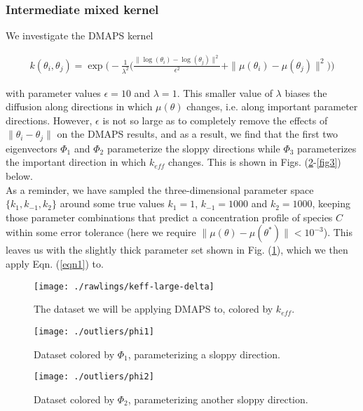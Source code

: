 \documentclass[11pt]{article}
\begin{document}
\subsubsection{Intermediate mixed kernel}

We investigate the DMAPS kernel

\begin{align}
  k(\theta_i, \theta_j) = \exp \bigg( -\frac{1}{\lambda^2} \bigg( \frac{\|\log(\theta_i)
  - \log(\theta_j)\|^2}{\epsilon^2} + \|\mu(\theta_i) -
  \mu(\theta_j)\|^2\bigg) \bigg)
  \label{eqn1}
\end{align}

with parameter values $\epsilon = 10$ and $\lambda = 1$. This smaller
value of $\lambda$ biases the diffusion along directions in which
$\mu(\theta)$ changes, i.e. along important parameter
directions. However, $\epsilon$ is not so large as to completely
remove the effects of $\| \theta_i - \theta_j \|$ on the DMAPS
results, and as a result, we find that the first two eigenvectors
$\Phi_1$ and $\Phi_2$ parameterize the sloppy directions while
$\Phi_3$ parameterizes the important direction in which $k_{eff}$
changes. This is shown in Figs. (\ref{fig1}-\ref{fig3}) below. \\

As a reminder, we have sampled the three-dimensional parameter space
$\{k_1, k_{-1}, k_2 \}$ around some true values $k_1 = 1$,
$k_{-1} = 1000$ and $k_2 = 1000$, keeping those parameter combinations that
predict a concentration profile of species $C$ within some error
tolerance (here we require $\| \mu(\theta) - \mu(\theta^*) \| <
10^{-3}$). This leaves us with the slightly thick parameter set shown
in Fig. (\ref{fig0}), which we then apply Eqn. (\ref{eqn1}) to.

\begin{figure}[htbp]
  \centering
  \texttt{[image: ./rawlings/keff-large-delta]}
  \caption{The dataset we will be applying DMAPS to, colored by
    $k_{eff}$. \label{fig0}}
\end{figure}

\begin{figure}[htbp]
  \centering
  \texttt{[image: ./outliers/phi1]}
  \caption{Dataset colored by $\Phi_1$, parameterizing a sloppy
    direction. \label{fig1}}
\end{figure}

\begin{figure}[htbp]
  \centering
  \texttt{[image: ./outliers/phi2]}
  \caption{Dataset colored by $\Phi_2$, parameterizing another sloppy
    direction. \label{fig2}}
\end{figure}
\end{document}
